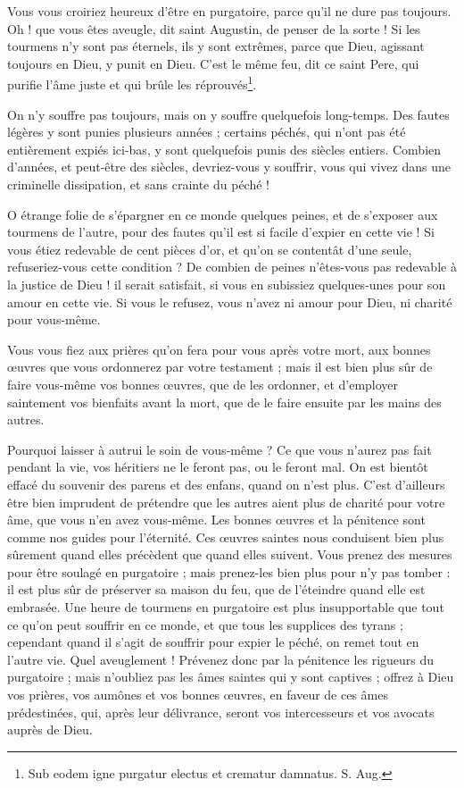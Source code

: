 \documentclass[instructions.tex]{subfiles}
\begin{document}
Vous vous croiriez heureux d’être en purgatoire, parce qu’il ne dure pas toujours. Oh ! que vous êtes aveugle, dit saint Augustin, de penser de la sorte ! Si les tourmens n’y sont pas éternels, ils y sont extrêmes, parce que Dieu, agissant toujours en Dieu, y punit en Dieu. C’est le même feu, dit ce saint Pere, qui purifie l’âme juste et qui brûle les réprouvés\footnote{Sub eodem igne purgatur electus et crematur damnatus. S. Aug.}.
 
On n’y souffre pas toujours, mais on y souffre quelquefois long-temps. Des fautes légères y sont punies plusieurs années ; certains péchés, qui n’ont pas été entièrement expiés ici-bas, y sont quelquefois punis des siècles entiers. Combien d’années, et peut-être des siècles, devriez-vous y souffrir, vous qui vivez dans une criminelle dissipation, et sans crainte du péché !
 
O étrange folie de s’épargner en ce monde quelques peines, et de s’exposer aux tourmens de l’autre, pour des fautes qu’il est si facile d’expier en cette vie ! Si vous étiez redevable de cent pièces d’or, et qu’on se contentât d’une seule, refuseriez-vous cette condition ? De combien de peines n’êtes-vous pas redevable à la justice de Dieu ! il serait satisfait, si vous en subissiez quelques-unes pour son amour en cette vie. Si vous le refusez, vous n’avez ni amour pour Dieu, ni charité pour vous-même.
 
Vous vous fiez aux prières qu’on fera pour vous après votre mort, aux bonnes œuvres que vous ordonnerez par votre testament ; mais il est bien plus sûr de faire vous-même vos bonnes œuvres, que de les ordonner, et d’employer saintement vos bienfaits avant la mort, que de le faire ensuite par les mains des autres.
 
Pourquoi laisser à autrui le soin de vous-même ? Ce que vous n’aurez pas fait pendant la vie, vos héritiers ne le feront pas, ou le feront mal. On est bientôt effacé du souvenir des parens et des enfans, quand on n’est plus. C’est d’ailleurs être bien imprudent de prétendre que les autres aient plus de charité pour votre âme, que vous n’en avez vous-même. Les bonnes œuvres et la pénitence sont comme nos guides pour l’éternité. Ces œuvres saintes nous conduisent bien plus sûrement quand elles précèdent que quand elles suivent. Vous prenez des mesures pour être soulagé en purgatoire ; mais prenez-les bien plus pour n’y pas tomber : il est plus sûr de préserver sa maison du feu, que de l’éteindre quand elle est embrasée. Une heure de tourmens en purgatoire est plus insupportable que tout ce qu’on peut souffrir en ce monde, et que tous les supplices des tyrans ; cependant quand il s’agit de souffrir pour expier le péché, on remet tout en l’autre vie. Quel aveuglement ! Prévenez donc par la pénitence les rigueurs du purgatoire ; mais n’oubliez pas les âmes saintes qui y sont captives ; offrez à Dieu vos prières, vos aumônes et vos bonnes œuvres, en faveur de ces âmes prédestinées, qui, après leur délivrance, seront vos intercesseurs et vos avocats auprès de Dieu.
 
\end{document}
